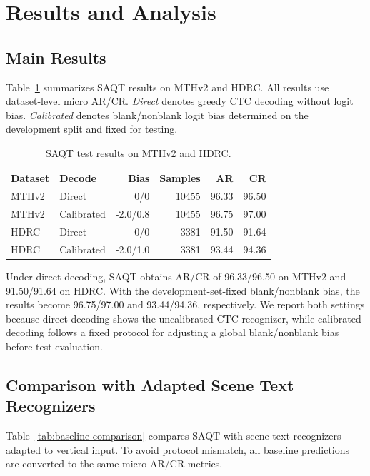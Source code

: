 \section{Results and Analysis}

\subsection{Main Results}

Table~\ref{tab:main-results} summarizes SAQT results on MTHv2 and HDRC. All results use dataset-level micro AR/CR. \emph{Direct} denotes greedy CTC decoding without logit bias. \emph{Calibrated} denotes blank/nonblank logit bias determined on the development split and fixed for testing.

\begin{table}[t]
\centering
\caption{SAQT test results on MTHv2 and HDRC.}
\label{tab:main-results}
\begin{tabular}{llrrrr}
\toprule
Dataset & Decode & Bias & Samples & AR & CR \\
\midrule
MTHv2 & Direct & 0/0 & 10455 & 96.33 & 96.50 \\
MTHv2 & Calibrated & -2.0/0.8 & 10455 & 96.75 & 97.00 \\
HDRC & Direct & 0/0 & 3381 & 91.50 & 91.64 \\
HDRC & Calibrated & -2.0/1.0 & 3381 & 93.44 & 94.36 \\
\bottomrule
\end{tabular}
\end{table}

Under direct decoding, SAQT obtains AR/CR of 96.33/96.50 on MTHv2 and 91.50/91.64 on HDRC. With the development-set-fixed blank/nonblank bias, the results become 96.75/97.00 and 93.44/94.36, respectively. We report both settings because direct decoding shows the uncalibrated CTC recognizer, while calibrated decoding follows a fixed protocol for adjusting a global blank/nonblank bias before test evaluation.

\subsection{Comparison with Adapted Scene Text Recognizers}

Table~\ref{tab:baseline-comparison} compares SAQT with scene text recognizers adapted to vertical input. To avoid protocol mismatch, all baseline predictions are converted to the same micro AR/CR metrics.


